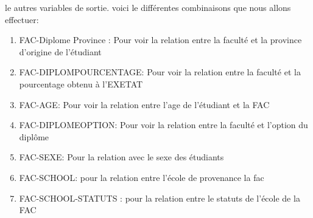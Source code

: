  le autres variables de sortie. voici le différentes combinaisons que
 nous allons effectuer: 
 \begin{enumerate}
 	\item FAC-Diplome Province : Pour voir la relation
 	entre la faculté et la province d'origine de l'étudiant
 	\item FAC-DIPLOMPOURCENTAGE: Pour voir la relation entre la faculté et la
 	pourcentage obtenu à l'\ac{EXETAT}
 	\item FAC-AGE: Pour voir la relation entre
 	l'age de l'étudiant et la FAC
 	\item FAC-DIPLOMEOPTION: Pour voir la
 	relation entre la faculté et l'option du diplôme
 	\item FAC-SEXE: Pour la
 	relation avec le sexe des étudiants 
 	\item FAC-SCHOOL: pour la relation
 	entre l'école de provenance la fac 
 	\item FAC-SCHOOL-STATUTS : pour la relation
 	entre le statuts de l'école de la FAC
 \end{enumerate}
